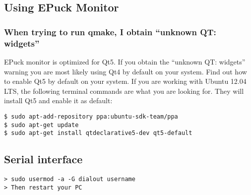 \subsection{Using EPuck Monitor}

\subsubsection{When trying to run qmake, I obtain ``unknown QT: widgets''}
EPuck monitor is optimized for Qt5. If you obtain the ``unknown QT: widgets'' warning you are most likely using Qt4 by default on your system. Find out how to enable Qt5 by default on your system. If you are working with Ubuntu 12.04 LTS, the following terminal commands are what you are looking for. They will install Qt5 and enable it as default:
\begin{lstlisting}
$ sudo apt-add-repository ppa:ubuntu-sdk-team/ppa
$ sudo apt-get update
$ sudo apt-get install qtdeclarative5-dev qt5-default
\end{lstlisting}


\subsection{Serial interface}
\begin{lstlisting}
> sudo usermod -a -G dialout username
> Then restart your PC

\end{lstlisting}
